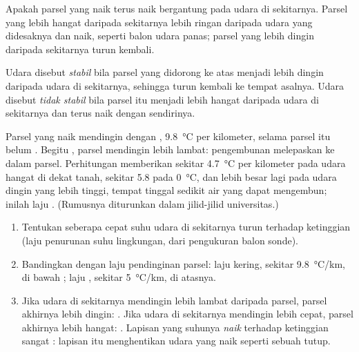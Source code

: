 Apakah parsel yang naik terus naik bergantung pada udara di sekitarnya. Parsel
yang lebih hangat daripada sekitarnya lebih ringan daripada udara yang
didesaknya dan naik, seperti balon udara panas; parsel yang lebih dingin
daripada sekitarnya turun kembali.

\begin{definition}\label{def:g10:why-clouds-form:stability}
Udara disebut \emph{stabil} bila parsel yang didorong ke
atas menjadi lebih dingin daripada udara di sekitarnya, sehingga turun kembali
ke tempat asalnya. Udara disebut \emph{tidak stabil}
bila parsel itu menjadi lebih hangat daripada udara di sekitarnya dan terus
naik dengan sendirinya.
\end{definition}

Parsel yang naik mendingin dengan ,
\qty{9.8}{\degreeCelsius} per kilometer, selama parsel itu belum . Begitu
, parsel mendingin lebih lambat: pengembunan melepaskan  ke
dalam parsel. Perhitungan memberikan sekitar \qty{4.7}{\degreeCelsius} per
kilometer pada udara hangat di dekat tanah, sekitar \num{5.8} pada
\qty{0}{\degreeCelsius}, dan lebih besar lagi pada udara dingin yang lebih
tinggi, tempat tinggal sedikit air yang dapat mengembun; inilah laju .
(Rumusnya diturunkan dalam jilid-jilid universitas.)

\begin{method}\label{met:g10:why-clouds-form:stable}
\begin{enumerate}
  \item Tentukan seberapa cepat suhu udara di sekitarnya turun terhadap
        ketinggian (laju penurunan suhu lingkungan, dari pengukuran balon
        sonde).
  \item Bandingkan dengan laju pendinginan parsel: laju kering, sekitar
        \qty{9.8}{\degreeCelsius/km}, di bawah ; laju
        , sekitar \qty{5}{\degreeCelsius/km}, di atasnya.
  \item Jika udara di sekitarnya mendingin lebih lambat daripada parsel,
        parsel akhirnya lebih dingin: . Jika udara di sekitarnya
        mendingin lebih cepat, parsel akhirnya lebih hangat: .
        Lapisan yang suhunya \emph{naik} terhadap ketinggian sangat :
        lapisan itu menghentikan udara yang naik seperti sebuah tutup.
\end{enumerate}
\end{method}

